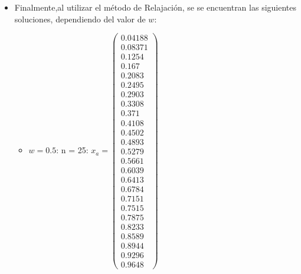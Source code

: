 \documentclass{udpreport}
\begin{document}
\begin{enumerate}
\begin {enumerate}
\begin{enumerate}
\begin{itemize}
				\item Finalmente,al utilizar el método de Relajación, se se encuentran las siguientes soluciones, dependiendo del valor de $w$:
				\begin{itemize}
				\item $w = 0.5$:
				n = 25: $x_{a} = \left(\begin{array}{c} 0.04188\\ 0.08371\\ 0.1254\\ 0.167\\ 0.2083\\ 0.2495\\ 0.2903\\ 0.3308\\ 0.371\\ 0.4108\\ 0.4502\\ 0.4893\\ 0.5279\\ 0.5661\\ 0.6039\\ 0.6413\\ 0.6784\\ 0.7151\\ 0.7515\\ 0.7875\\ 0.8233\\ 0.8589\\ 0.8944\\ 0.9296\\ 0.9648 \end{array}\right)$ 

\end{itemize}
\end{itemize}
\end{enumerate}
\end{enumerate}
\end{enumerate}
\end{document}
